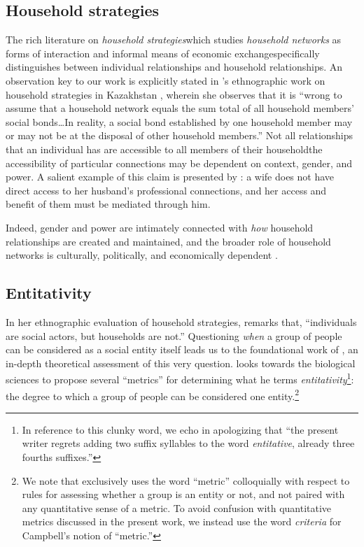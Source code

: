 \subsection*{Household strategies}\label{subsec:housestrat}

The rich literature on \textit{household strategies}\textemdash which studies \textit{household networks} as forms of interaction and informal means of economic exchange\textemdash specifically distinguishes between individual relationships and household relationships. An observation key to our work is explicitly stated in \citeauthor{werner1998}'s ethnographic work on household strategies in Kazakhstan \citep{werner1998},  wherein she observes that it is ``wrong to assume that a household network equals the sum total of all household members' social bonds\dots In reality, a social bond established by one household member may or may not be at the disposal of other household members.'' Not all relationships that an individual has are accessible to all members of their household\textemdash the accessibility of particular connections may be dependent on context, gender, and power. A salient example of this claim is presented by \cite{werner1998}: a wife does not have direct access to her husband's professional connections, and her access and benefit of them must be mediated through him. 

Indeed, gender and power are intimately connected with \textit{how} household relationships are created and maintained, and the broader role of household networks is culturally, politically, and economically dependent \citep[see, e.g.,][]{werner1998, schmink1984household, wallace2002household, niehof2011conceptualizing, yotebieng2018household}.

\subsection*{Entitativity}\label{subsec:entity}

In her ethnographic evaluation of household strategies, \cite{werner1998} remarks that, ``individuals are social actors, but households are not.'' Questioning \textit{when} a group of people can be considered as a social entity itself leads us to the foundational work of \cite{campbell1958common}, an in-depth theoretical assessment of this very question. \citeauthor{campbell1958common} looks towards the biological sciences to propose several ``metrics'' for determining what he terms \textit{entitativity}\footnote{In reference to this clunky word, we echo \citeauthor{campbell1958common} in apologizing that ``the present writer regrets adding two suffix syllables to the word \textit{entitative}, already three fourths suffixes.''}: the degree to which a group of people can be considered one entity.\footnote{We note that \citeauthor{campbell1958common} exclusively uses the word ``metric'' colloquially with respect to rules for assessing whether a group is an entity or not, and not paired with any quantitative sense of a metric. To avoid confusion with quantitative metrics discussed in the present work, we instead use the word \textit{criteria} for Campbell's notion of ``metric.''}

